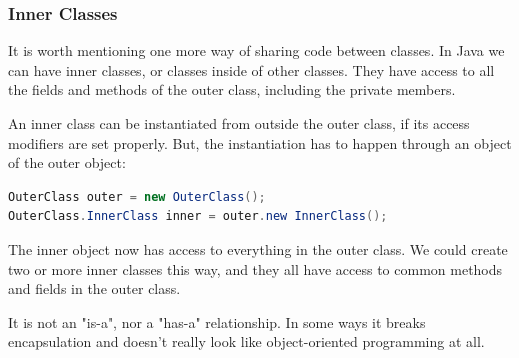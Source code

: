 \subsubsection{Inner Classes}
It is worth mentioning one more way of sharing code between classes. In Java we can have inner classes, or classes inside of other classes. They have access to all the fields and methods of the outer class, including the private members.

An inner class can be instantiated from outside the outer class, if its access modifiers are set properly. But, the instantiation has to happen through an object of the outer object:
\begin{lstlisting}[language=Java]
OuterClass outer = new OuterClass();
OuterClass.InnerClass inner = outer.new InnerClass();
\end{lstlisting}

The inner object now has access to everything in the outer class. We could create two or more inner classes this way, and they all have access to common methods and fields in the outer class. 

It is not an "is-a", nor a "has-a" relationship. In some ways it breaks encapsulation and doesn't really look like object-oriented programming at all.